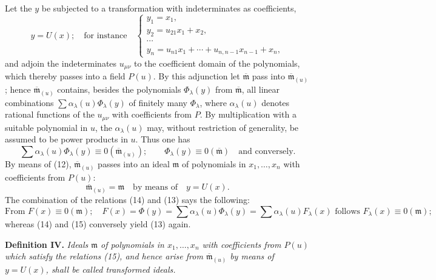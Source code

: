 \documentclass[11pt]{article}
\newcommand{\mideal}{\mathfrak m}
\newcommand{\zero}[1]{\equiv 0(#1)}
\begin{document}
Let the $y$ be subjected to a transformation with indeterminates as coefficients,
\begin{equation}
 y=U(x);\quad \text{for instance}\quad
 \begin{cases}
 y_1=x_1,\\
 y_2=u_{21}x_1+x_2,\\
 \cdots\\
 y_n=u_{n1}x_1+\cdots+u_{n,n-1}x_{n-1}+x_n,
 \end{cases}
\tag{12}
\end{equation}
and adjoin the indeterminates $u_{\mu\nu}$ to the coefficient domain of the polynomials, which thereby passes into a field $P(u)$. By this adjunction let $\overline{\mideal}$ pass into $\overline{\mideal}_{(u)}$; hence $\overline{\mideal}_{(u)}$ contains, besides the polynomials $\Phi_\lambda(y)$ from $\overline{\mideal}$, all linear combinations $\sum \alpha_\lambda(u)\Phi_\lambda(y)$ of finitely many $\Phi_\lambda$, where $\alpha_\lambda(u)$ denotes rational functions of the $u_{\mu\nu}$ with coefficients from $P$. By multiplication with a suitable polynomial in $u$, the $\alpha_\lambda(u)$ may, without restriction of generality, be assumed to be power products in $u$. Thus one has
\begin{equation}
 \sum \alpha_\lambda(u)\Phi_\lambda(y)\zero{\overline{\mideal}_{(u)}};
 \qquad
 \Phi_\lambda(y)\zero{\overline{\mideal}}\quad\text{and conversely}.
\tag{13}
\end{equation}
By means of (12), $\overline{\mideal}_{(u)}$ passes into an ideal $\mideal$ of polynomials in $x_1,\ldots,x_n$ with coefficients from $P(u)$:
\begin{equation}
 \overline{\mideal}_{(u)}=\mideal\quad \text{by means of}\quad y=U(x).
\tag{14}
\end{equation}
The combination of the relations (14) and (13) says the following:
\begin{equation}
 \text{From } F(x)\zero{\mideal};\quad
 F(x)=\Phi(y)=\sum \alpha_\lambda(u)\Phi_\lambda(y)=\sum \alpha_\lambda(u)F_\lambda(x)
 \text{ follows } F_\lambda(x)\zero{\mideal};
\tag{15}
\end{equation}
whereas (14) and (15) conversely yield (13) again.

\medskip
\noindent\textbf{Definition IV.} \emph{Ideals $\mideal$ of polynomials in $x_1,\ldots,x_n$ with coefficients from $P(u)$ which satisfy the relations (15), and hence arise from $\overline{\mideal}_{(u)}$ by means of $y=U(x)$, shall be called transformed ideals.}
\end{document}

